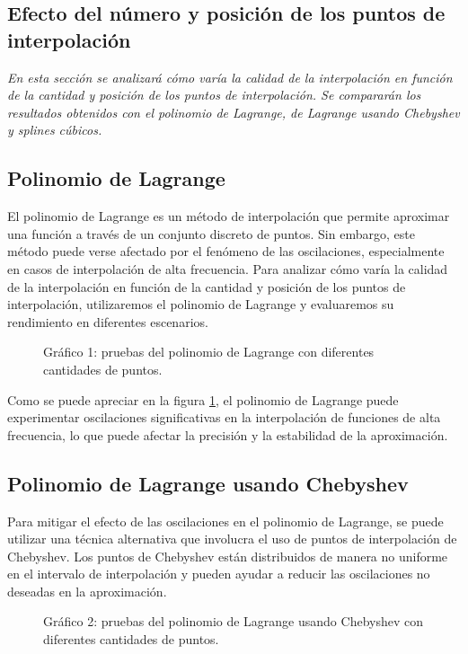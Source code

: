 \documentclass[12pt,a4]{article} %
\begin{document}
\begin{multicols}{2}
\section{Efecto del número y posición de los puntos de interpolación}

\textit{En esta sección se analizará cómo varía la calidad de la interpolación en función de la cantidad y posición de los puntos de interpolación. Se compararán los resultados obtenidos con el polinomio de Lagrange, de Lagrange usando Chebyshev y splines cúbicos.}

\subsection{Polinomio de Lagrange}

El polinomio de Lagrange es un método de interpolación que permite aproximar una función a través de un conjunto discreto de puntos. Sin embargo, este método puede verse afectado por el fenómeno de las oscilaciones, especialmente en casos de interpolación de alta frecuencia. Para analizar cómo varía la calidad de la interpolación en función de la cantidad y posición de los puntos de interpolación, utilizaremos el polinomio de Lagrange y evaluaremos su rendimiento en diferentes escenarios.

\begin{figure}
    \centering
    \caption{Gráfico 1: pruebas del polinomio de Lagrange con diferentes cantidades de puntos.}
    \label{graf1}
\end{figure}

Como se puede apreciar en la figura \ref{graf1}, el polinomio de Lagrange puede experimentar oscilaciones significativas en la interpolación de funciones de alta frecuencia, lo que puede afectar la precisión y la estabilidad de la aproximación.

\subsection{Polinomio de Lagrange usando Chebyshev}

Para mitigar el efecto de las oscilaciones en el polinomio de Lagrange, se puede utilizar una técnica alternativa que involucra el uso de puntos de interpolación de Chebyshev. Los puntos de Chebyshev están distribuidos de manera no uniforme en el intervalo de interpolación y pueden ayudar a reducir las oscilaciones no deseadas en la aproximación.

\begin{figure}
    \centering
    \caption{Gráfico 2: pruebas del polinomio de Lagrange usando Chebyshev con diferentes cantidades de puntos.}
    \label{graf2}
\end{figure}


\end{multicols}
\end{document}
